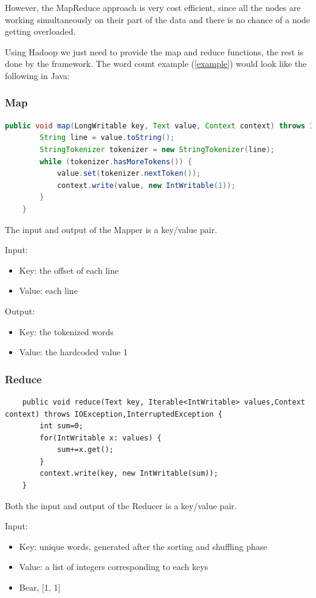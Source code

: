 However, the MapReduce approach is very cost efficient, since all the nodes are working simultaneously on their part of the data and there is no chance of a node getting overloaded.

Using Hadoop we just need to provide the map and reduce functions, the rest is done by the framework.  The word count example (\ref{example}) would look like the following in Java:
\subsubsection*{Map  \cite{MapReduce-example}}
\begin{lstlisting}[language=Java]
	public void map(LongWritable key, Text value, Context context) throws IOException,InterruptedException {
		String line = value.toString();
		StringTokenizer tokenizer = new StringTokenizer(line);
		while (tokenizer.hasMoreTokens()) {
			value.set(tokenizer.nextToken());
			context.write(value, new IntWritable(1));
		}
	}
\end{lstlisting}
The input and output of the Mapper is a key/value pair. 

\noindent Input:
\begin{itemize}
	\item Key: the offset of each line
	\item Value: each line
\end{itemize}

\noindent Output:
\begin{itemize}
	\item Key: the tokenized words
	\item Value: the hardcoded value 1
\end{itemize}

\subsubsection*{Reduce  \cite{MapReduce-example}}
\begin{lstlisting}
	public void reduce(Text key, Iterable<IntWritable> values,Context context) throws IOException,InterruptedException {
		int sum=0;
		for(IntWritable x: values) {
			sum+=x.get();
		}
		context.write(key, new IntWritable(sum));
	}
\end{lstlisting}
Both the input and output of the Reducer is a key/value pair. 

\noindent Input:
\begin{itemize}
	\item Key: unique words, generated after the sorting and shuffling phase
	\item Value: a list of integers corresponding to each keys
	\item \eg Bear, [1, 1]
\end{itemize}

